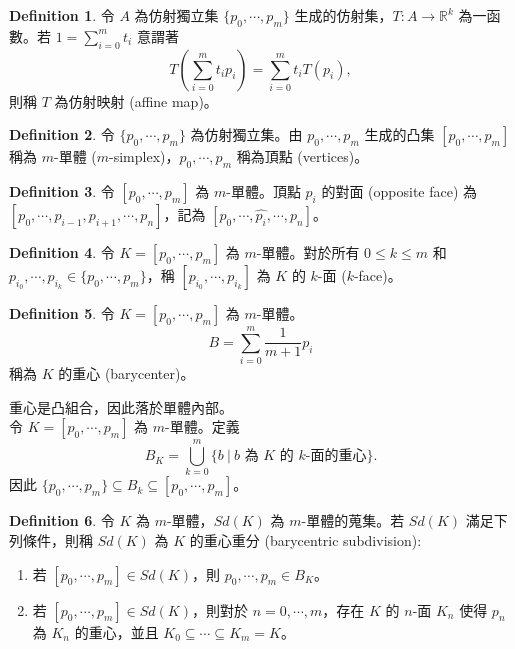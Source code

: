 \documentclass[12pt]{article}
\theoremstyle{definition}
\newtheorem{definition}{Definition}[section]
\newcommand\<{\langle}
\renewcommand\>{\rangle}
\begin{document}
\begin{CJK}{UTF8}{bsmi}
\begin{definition}
    令 $A$ 為仿射獨立集 $\{p_0, \cdots, p_m\}$ 生成的仿射集，$T:A\to\mathbb{R}^k$ 為一函數。若 $1=\sum_{i=0}^m t_i$ 意謂著
    \[
        T\left(\sum_{i=0}^m t_i p_i\right)
        = \sum_{i=0}^m t_i T(p_i),
    \]
    則稱 $T$ 為仿射映射 (affine map)。
\end{definition}

\begin{definition}
    令 $\{p_0, \cdots, p_m\}$ 為仿射獨立集。由 $p_0, \cdots, p_m$ 生成的凸集 $[p_0, \cdots, p_m]$ 稱為 $m$-單體 ($m$-simplex)，$p_0, \cdots, p_m$ 稱為頂點 (vertices)。
\end{definition}

\begin{definition}
    令 $[p_0, \cdots, p_m]$ 為 $m$-單體。頂點 $p_i$ 的對面 (opposite face) 為 $[p_0, \cdots, p_{i-1}, p_{i+1}, \cdots, p_n]$，記為 $[p_0, \cdots, \hat{p_i}, \cdots, p_n]$。
\end{definition}

\begin{definition}
    令 $K=[p_0, \cdots, p_m]$ 為 $m$-單體。對於所有 $0\le k\le m$ 和 $p_{i_0}, \cdots, p_{i_k}\in\{p_0, \cdots, p_m\}$，稱 $[p_{i_0}, \cdots, p_{i_k}]$ 為 $K$ 的 $k$-面 ($k$-face)。
\end{definition}

\begin{definition}
    令 $K=[p_0, \cdots, p_m]$ 為 $m$-單體。
    \[
        B = \sum_{i=0}^m \frac{1}{m+1} p_i
    \]
    稱為 $K$ 的重心 (barycenter)。
\end{definition}

重心是凸組合，因此落於單體內部。 \\

令 $K=[p_0, \cdots, p_m]$ 為 $m$-單體。定義
\[
    B_K = \bigcup_{k=0}^m \{b\ |\ b\text{ 為 }K\text{ 的 }k\text{-面的重心}\}.
\]
因此 $\{p_0, \cdots, p_m\}\subseteq B_k\subseteq[p_0, \cdots, p_m]$。

\begin{definition}
    令 $K$ 為 $m$-單體，$Sd(K)$ 為 $m$-單體的蒐集。若 $Sd(K)$ 滿足下列條件，則稱 $Sd(K)$ 為 $K$ 的重心重分 (barycentric subdivision):
    \begin{enumerate}
        \item 若 $[p_0, \cdots, p_m]\in Sd(K)$，則 $p_0, \cdots, p_m\in B_K$。
        \item 若 $[p_0, \cdots, p_m]\in Sd(K)$，則對於 $n=0, \cdots, m$，存在 $K$ 的 $n$-面 $K_n$ 使得 $p_n$ 為 $K_n$ 的重心，並且 $K_0\subseteq\cdots\subseteq K_m=K$。
    \end{enumerate}
\end{definition}


\end{CJK}
\end{document}
